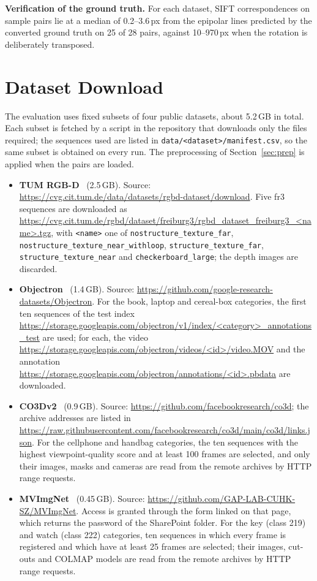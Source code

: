 \documentclass[journal]{IEEEtran}
\begin{document}
\textbf{Verification of the ground truth.} For each dataset, SIFT correspondences on sample pairs lie at a median of 0.2--3.6\,px from the epipolar lines predicted by the converted ground truth on 25 of 28 pairs, against 10--970\,px when the rotation is deliberately transposed.






\section{Dataset Download}\label{app:download}
The evaluation uses fixed subsets of four public datasets, about 5.2\,GB in total. Each subset is fetched by a script in the repository that downloads only the files required; the sequences used are listed in \texttt{data/<dataset>/manifest.csv}, so the same subset is obtained on every run. The preprocessing of Section~\ref{sec:prep} is applied when the pairs are loaded.

\begin{itemize}
  \item \textbf{TUM RGB-D}~\cite{tum} (2.5\,GB). Source: \url{https://cvg.cit.tum.de/data/datasets/rgbd-dataset/download}. Five fr3 sequences are downloaded as \url{https://cvg.cit.tum.de/rgbd/dataset/freiburg3/rgbd_dataset_freiburg3_<name>.tgz}, with \texttt{<name>} one of \texttt{nostructure\_texture\_far}, \texttt{nostructure\_texture\_near\_withloop}, \texttt{structure\_texture\_far}, \texttt{structure\_texture\_near} and \texttt{checkerboard\_large}; the depth images are discarded.
  \item \textbf{Objectron}~\cite{objectron} (1.4\,GB). Source: \url{https://github.com/google-research-datasets/Objectron}. For the book, laptop and cereal-box categories, the first ten sequences of the test index \url{https://storage.googleapis.com/objectron/v1/index/<category>_annotations_test} are used; for each, the video \url{https://storage.googleapis.com/objectron/videos/<id>/video.MOV} and the annotation \url{https://storage.googleapis.com/objectron/annotations/<id>.pbdata} are downloaded.
  \item \textbf{CO3Dv2}~\cite{co3d} (0.9\,GB). Source: \url{https://github.com/facebookresearch/co3d}; the archive addresses are listed in \url{https://raw.githubusercontent.com/facebookresearch/co3d/main/co3d/links.json}. For the cellphone and handbag categories, the ten sequences with the highest viewpoint-quality score and at least 100 frames are selected, and only their images, masks and cameras are read from the remote archives by HTTP range requests.
  \item \textbf{MVImgNet}~\cite{mvimgnet} (0.45\,GB). Source: \url{https://github.com/GAP-LAB-CUHK-SZ/MVImgNet}. Access is granted through the form linked on that page, which returns the password of the SharePoint folder. For the key (class 219) and watch (class 222) categories, ten sequences in which every frame is registered and which have at least 25 frames are selected; their images, cut-outs and COLMAP models are read from the remote archives by HTTP range requests.
\end{itemize}
\end{document}
